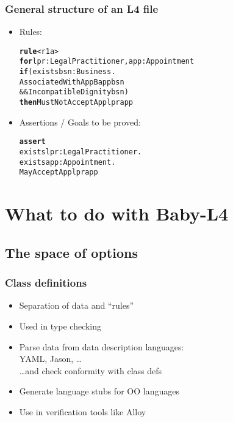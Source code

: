 \documentclass{beamer}
\begin{document}
\begin{frame}[fragile]\frametitle{General structure of an L4 file}


  \begin{itemize}
  \item Rules:
\begin{alltt}
\textbf{rule} <r1a>
\textbf{for} lpr: LegalPractitioner, app: Appointment
\textbf{if} (exists bsn : Business. 
         AssociatedWithAppB app bsn 
      \&\& IncompatibleDignity bsn)
\textbf{then} MustNotAcceptApp lpr app
\end{alltt}
  
\item Assertions / Goals to be proved:
\begin{alltt}
\textbf{assert} 
  exists lpr: LegalPractitioner. 
  exists app: Appointment. 
      MayAcceptApp lpr app
\end{alltt}
  \end{itemize}

\end{frame}

  
\section{What to do with Baby-L4}

\subsection{The space of options}


\begin{frame}[fragile]\frametitle{Class definitions}

  \begin{itemize}
  \item Separation of data and ``rules''
  \item Used in type checking
  \end{itemize}
  
  \begin{itemize}
  \item Parse data from data description languages:\\
    YAML, Jason, \dots\\
    \dots and check conformity with class defs
  \item Generate language stubs for OO languages
  \item Use in verification tools like Alloy
  \end{itemize}

\end{frame}
\end{document}
